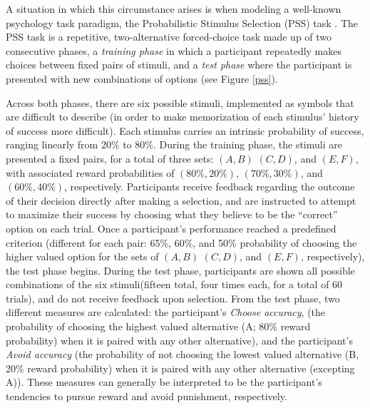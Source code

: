 \documentclass[10pt,letterpaper]{article}
\begin{document}
A situation in which this circumstance arises is when modeling a well-known psychology task paradigm, the Probabilistic Stimulus Selection (PSS) task \cite{frank2004carrot}. The PSS task is a repetitive, two-alternative forced-choice task made up of two consecutive phases, a \emph{training phase} in which a participant repeatedly makes choices between fixed pairs of stimuli, and a \emph{test phase} where the participant is presented with new combinations of options (see Figure \ref{pss}).

Across both phases, there are six possible stimuli, implemented as symbols that are difficult to describe (in order to make memorization of each stimulus’ history of success more difficult). Each stimulus carries an intrinsic probability of success, ranging linearly from 20\% to 80\%. During the training phase, the stimuli are presented a fixed pairs, for a total of three sets: $(A, B)$  $(C,D)$, and $(E, F)$, with associated reward probabilities of $(80\%, 20\%)$, $(70\%, 30\%)$, and $(60\%, 40\%)$, respectively. Participants receive feedback regarding the outcome of their decision directly after making a selection, and are instructed to attempt to maximize their success by choosing what they believe to be the ``correct'' option on each trial. Once a participant's performance reached a predefined criterion (different for each pair: 65\%, 60\%, and 50\% probability of choosing the higher valued option for the sets of $(A, B)$  $(C,D)$, and $(E, F)$, respectively), the test phase begins. During the test phase, participants are shown all possible combinations of the six stimuli(fifteen total, four times each, for a total of 60 trials), and do not receive feedback upon selection. From the test phase, two different measures are calculated: the participant's \emph{Choose accuracy}, (the probability of choosing the highest valued alternative (A; 80\% reward probability) when it is paired with any other alternative), and the participant's \emph{Avoid accuracy} (the probability of not choosing the lowest valued alternative (B, 20\% reward probability) when it is paired with any other alternative (excepting A)). These measures can generally be interpreted to be the participant's tendencies to pursue reward and avoid punishment, respectively.
\end{document}
